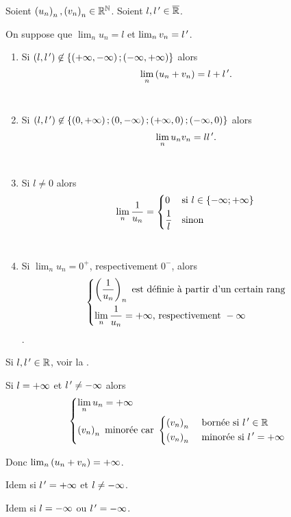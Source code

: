 \begin{theo}
Soient \(\left(u_n\right)_n,\left(v_n\right)_n\in\mathbb{R}^{\mathbb{N}}\). Soient \(l,l^{\,\prime}\in\overline{\mathbb{R}}\).

On suppose que \(\lim_nu_n=l\) et \(\lim_nv_n=l^{\,\prime}\).

\begin{enumerate}
\item Si \(\left(l,l^{\,\prime}\right)\not\in\left\lbrace\left(+\infty,-\infty\right);\left(-\infty,+\infty\right)\right\rbrace\) alors \[\lim_n\left(u_n+v_n\right)=l+l^{\,\prime}.\] \\

\item Si \(\left(l,l^{\,\prime}\right)\not\in\left\lbrace\left(0,+\infty\right);\left(0,-\infty\right);\left(+\infty,0\right);\left(-\infty,0\right)\right\rbrace\) alors \[\lim_nu_nv_n=ll^{\,\prime}.\] \\

\item Si \(l\not=0\) alors \[\lim_n\dfrac{1}{u_n}=\begin{dcases}0&\text{si }l\in\left\lbrace-\infty;+\infty\right\rbrace \\ \dfrac{1}{l}&\text{sinon}\end{dcases}\] \\

\item Si \(\lim_nu_n=0^+\), respectivement \(0^-\), alors \[\begin{dcases}\left(\dfrac{1}{u_n}\right)_n\text{ est définie à partir d'un certain rang} \\ \lim_n\dfrac{1}{u_n}=+\infty\text{, respectivement }-\infty\end{dcases}\].
\end{enumerate}
\end{theo}

\begin{dem}[1]
Si \(l,l^{\,\prime}\in\mathbb{R}\), voir la .

Si \(l=+\infty\) et \(l^{\,\prime}\not=-\infty\) alors \[\begin{dcases}\lim_nu_n=+\infty \\ \left(v_n\right)_n\text{ minorée car }\begin{dcases}\left(v_n\right)_n&\text{ bornée si }l^{\,\prime}\in\mathbb{R} \\ \left(v_n\right)_n&\text{ minorée si }l^{\,\prime}=+\infty\end{dcases}\end{dcases}\]

Donc \(\lim_n\left(u_n+v_n\right)=+\infty\).

Idem si \(l^{\,\prime}=+\infty\) et \(l\not=-\infty\).

Idem si \(l=-\infty\) ou \(l^{\,\prime}=-\infty\).
\end{dem}

